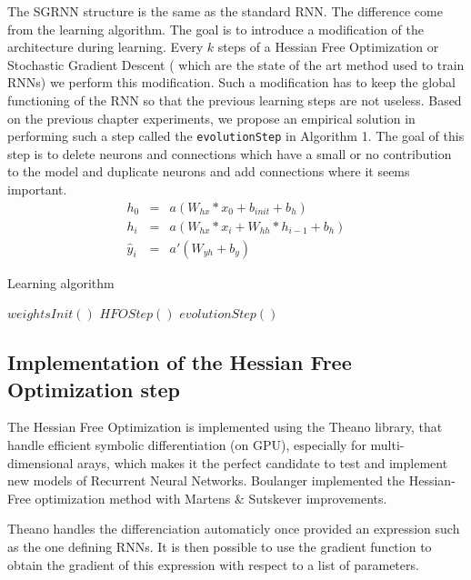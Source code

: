 The SGRNN structure is the same as the standard RNN. The difference come from the learning algorithm. The goal is to introduce a modification of the architecture during learning. Every $k$ steps of a Hessian Free Optimization or Stochastic Gradient Descent ( which are the state of the art method used to train RNNs) we perform this modification. Such a modification has to keep the global functioning of the RNN so that the previous learning steps are not useless. Based on the previous chapter experiments, we propose an empirical solution in performing such a step called the \verb?evolutionStep? in Algorithm 1. The goal of this step is to delete neurons and connections which have a small or no contribution to the model and duplicate neurons and add connections where it seems important.   
$$
\begin{array}{rcr} 
    h_0 & = & a(W_{hx}  * x_0 + b_{init} + b_h)  \\ 
    h_i & = & a(W_{hx}  * x_i + W _{hh} * h_{i-1} + b_h)  \\ 
    \hat{y}_i & = & a'(W_{yh} + b_y)

\end{array}
$$


\begin{algorithm}
    \caption{Learning algorithm}
    \begin{algorithmic}
    \STATE $ weightsInit() $
            \STATE $HFOStep()$
        \ENDFOR
        \STATE $evolutionStep()$
    \ENDWHILE
    
    \end{algorithmic}
\end{algorithm}

\subsection{Implementation of the Hessian Free Optimization step}
The Hessian Free Optimization \cite{martens2011learning} is implemented using the Theano library, that handle efficient symbolic differentiation (on GPU), especially for multi-dimensional arays, which makes it the perfect candidate to test and implement new models of Recurrent Neural Networks. Boulanger \cite{boulanger2012modeling} implemented the Hessian-Free optimization method with Martens \& Sutskever \cite{martens2011learning} improvements. 

Theano handles the differenciation automaticly once provided an expression such as the one defining RNNs. It is then possible to use the gradient function to obtain the gradient of this expression with respect to a list of parameters.

